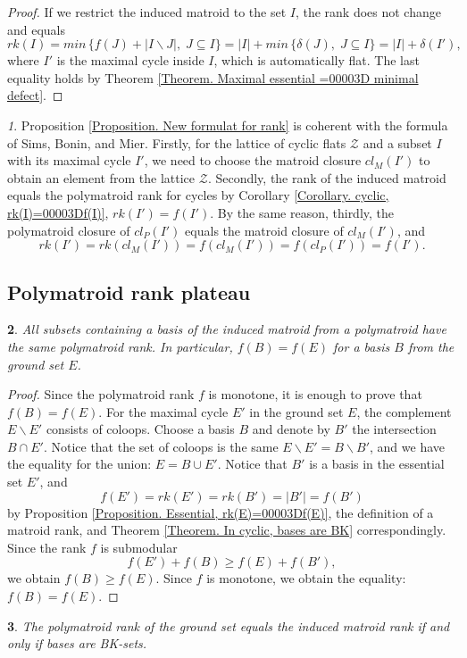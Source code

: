 \documentclass[11pt]{article}
\theoremstyle{plain}
\newtheorem{thm}{\protect\theoremname}[section]
\theoremstyle{definition}
\theoremstyle{remark}
\newtheorem{rem}[thm]{\protect\remarkname}
\theoremstyle{plain}
\theoremstyle{plain}
\theoremstyle{plain}
\newtheorem{cor}[thm]{\protect\corollaryname}
\theoremstyle{definition}
\providecommand{\corollaryname}{Corollary}
\providecommand{\remarkname}{Remark}
\providecommand{\theoremname}{Theorem}
\begin{document}
\begin{proof}
If we restrict the induced matroid to the set $I$, the rank does
not change and equals 
\[
rk(I)=min\,\{f(J)+|I\backslash J|,\;J\subseteq I\}=|I|+min\,\{\delta(J),\;J\subseteq I\}=|I|+\delta(I'),
\]
where $I'$ is the maximal cycle inside $I$, which is automatically
flat. The last equality holds by Theorem \ref{Theorem. Maximal essential =00003D minimal defect}.
\end{proof}
\begin{rem}
Proposition \ref{Proposition. New formulat for rank} is coherent
with the formula of Sims, Bonin, and Mier. Firstly, for the lattice
of cyclic flats $\mathcal{Z}$ and a subset $I$ with its maximal
cycle $I'$, we need to choose the matroid closure $cl_{M}(I')$ to
obtain an element from the lattice $\mathcal{Z}$. Secondly, the rank
of the induced matroid equals the polymatroid rank for cycles by Corollary
\ref{Corollary. cyclic, rk(I)=00003Df(I)}, $rk(I')=f(I')$. By the
same reason, thirdly, the polymatroid closure of $cl_{P}(I')$ equals
the matroid closure of $cl_{M}(I')$, and 
\[
rk(I')=rk(cl_{M}(I'))=f(cl_{M}(I'))=f(cl_{P}(I'))=f(I').
\]
\end{rem}


\subsection{Polymatroid rank plateau}
\begin{thm}
\label{Theorem. f(B)=00003Df(E)}All subsets containing a basis of
the induced matroid from a polymatroid have the same polymatroid rank.
In particular, $f(B)=f(E)$ for a basis $B$ from the ground set $E$.
\end{thm}

\begin{proof}
Since the polymatroid rank $f$ is monotone, it is enough to prove
that $f(B)=f(E)$. For the maximal cycle $E'$ in the ground set $E$,
the complement $E\backslash E'$ consists of coloops. Choose a basis
$B$ and denote by $B'$ the intersection $B\cap E'$. Notice that
the set of coloops is the same $E\backslash E'=B\backslash B'$, and
we have the equality for the union: $E=B\cup E'$. Notice that $B'$
is a basis in the essential set $E'$, and
\[
f(E')=rk(E')=rk(B')=|B'|=f(B')
\]
by Proposition \ref{Proposition. Essential, rk(E)=00003Df(E)}, the
definition of a matroid rank, and Theorem \ref{Theorem. In cyclic, bases are BK}
correspondingly. Since the rank $f$ is submodular
\[
f(E')+f(B)\geq f(E)+f(B'),
\]
we obtain $f(B)\geq f(E)$. Since $f$ is monotone, we obtain the
equality: $f(B)=f(E).$
\end{proof}
\begin{cor}
\label{Corollary. rk(E)=00003Df(E) iff bases are BK}The polymatroid
rank of the ground set equals the induced matroid rank if and only
if bases are BK-sets.
\end{cor}
\end{document}
